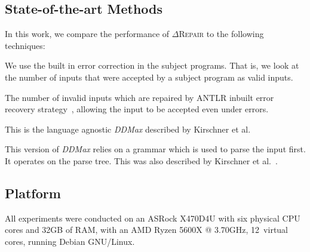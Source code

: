 \documentclass[acmsmall,screen,review,anonymous]{acmart}
\newcommand{\approach}{\textsc{$\Delta$Repair}\xspace}
\newcommand{\ddmax}{\textit{DDMax}\xspace}
\begin{document}
\subsection{State-of-the-art Methods}
In this work, we compare the performance of \approach to the following
techniques:
\begin{description}[wide]
\item[\textbf{(1) Baseline:}] We use the built in
  error correction in the subject programs. That is, we look at the number of
  inputs that were accepted by a subject program as valid inputs.

\item[\textbf{(2) ANTLR:}] The number of invalid inputs which are repaired
by ANTLR inbuilt error recovery strategy~\cite{parr2013definitive}, allowing the
input to be accepted even under errors.

\item[\textbf{(3) Lexical \ddmax:}] This is the language agnostic \ddmax described by Kirschner et al.~\cite{kirschner2020debugging}

\item[\textbf{(4) Syntactic \ddmax:}] This version of \ddmax relies on a grammar which is used to parse the
  input first. It operates on the parse tree. This was also described by Kirschner et al.~\cite{kirschner2020debugging}.

\end{description}


\subsection{Platform}

All experiments were conducted
on an ASRock X470D4U with six physical CPU cores and 32GB of RAM, with an AMD Ryzen 5600X @ 3.70GHz, 12~virtual cores, running Debian GNU/Linux.
\end{document}

